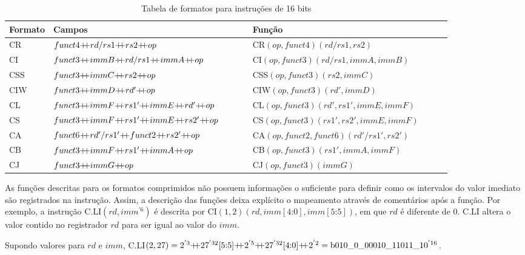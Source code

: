     \begin{table}
      \begin{tabular}{ |p{0.1\linewidth}|p{0.45\linewidth}|p{0.45\linewidth}| } 
        \hline
        Formato & Campos & Função \\ \hline \hline
        CR & $funct4 {+\!\!+} rd/rs1 {+\!\!+} rs2 {+\!\!+} op$ & CR$(op, funct4)(rd/rs1, rs2)$ \\ \hline
        CI & $funct3 \mdp immB \mdp rd/rs1 \mdp immA \mdp op$ & CI$(op, funct3)(rd/rs1, immA, immB)$ \\ \hline
        CSS & $funct3 {+\!\!+} immC {+\!\!+} rs2 {+\!\!+} op$ & CSS$(op, funct3)(rs2, immC)$ \\ \hline
        CIW & $funct3 {+\!\!+} immD {+\!\!+} rd' {+\!\!+} op$ & CIW$(op, funct3)(rd', immD)$ \\ \hline
        CL & $funct3 \mdp immF \mdp rs1' \mdp immE \mdp rd' \mdp op$ & CL$(op, funct3)(rd', rs1', immE, immF)$ \\ \hline
        CS & $funct3 \mdp immF \mdp rs1' \mdp immE \mdp rs2' \mdp op$ & CS$(op, funct3)(rs1', rs2', immE, immF)$ \\ \hline
        CA & $funct6 \mdp rd'/rs1' \mdp funct2 \mdp rs2' \mdp op$ & CA$(op, funct2, funct6)(rd'/rs1', rs2')$ \\ \hline
        CB & $funct3 \mdp immF \mdp rs1' \mdp immA \mdp op$ & CB$(op, funct3)(rs1', immA, immF)$ \\ \hline
        CJ & $funct3 {+\!\!+} immG {+\!\!+} op$ & CJ$(op, funct3)(immG)$ \\ \hline
      \end{tabular}
    \caption{Tabela de formatos para instruções de 16 bits \label{tab:if16f}}
    \end{table}

    As funções descritas para os formatos comprimidos não possuem informações o suficiente para definir 
    como os intervalos do valor imediato são registrados na instrução. Assim, a descrição das funções
    deixa explícito o mapeamento através de comentários após a função. 
    Por exemplo, a instrução 
    C.LI$(rd, imm^{'6})$ é descrita por CI$(1, 2)(rd, imm[4\text{:}0], imm[5\text{:}5])$,
    em que $rd$ é diferente de $0$.
    C.LI altera o valor contido no registrador $rd$ para ser igual ao valor do $imm$.

    Supondo valores para $rd$ e $imm$, C.LI$(2, 27) = 2^{'3}  \mdp  27^{'32}[5\text{:}5]  \mdp 
    2^{'5}  \mdp  27^{'32}[4\text{:}0]  \mdp  2^{'2} = \text{b}010\_0\_00010\_11011\_10^{'16}$.

